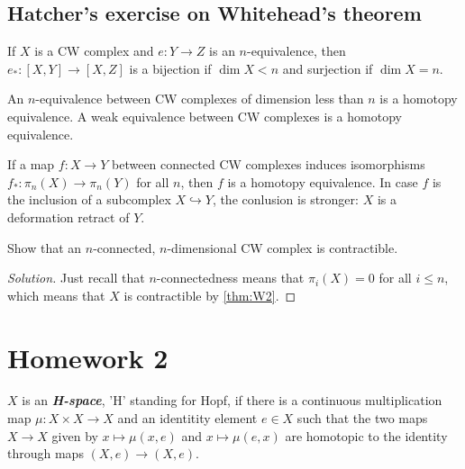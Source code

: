 \documentclass{article}
\numberwithin{equation}{section}
\begin{document}
\subsection{Hatcher's exercise on Whitehead's theorem}
\begin{thm}
	If $X$ is a CW complex and $e:Y\to Z$ is an $n$-equivalence, then $e_*:[X,Y]\to[X,Z]$ is a bijection if $\dim X<n$ and surjection if $\dim X=n$.
\end{thm}
\begin{thm}\label{thm:W2}
	An $n$-equivalence between CW complexes of dimension less than $n$ is a homotopy equivalence. A weak equivalence between CW complexes is a homotopy equivalence.
\end{thm}
\begin{thm}
	If a map $f:X\to Y$ between connected CW complexes induces isomorphisms $f_*:\pi_n(X)\to\pi_n(Y)$ for all $n$, then $f$ is a homotopy equivalence. In case $f$ is the inclusion of a subcomplex $X\hookrightarrow Y$, the conlusion is stronger: $X$ is a deformation retract of $Y$.
\end{thm}
\begin{exercise}[Hatcher 4.1.12]
	Show that an $n$-connected, $n$-dimensional CW complex is contractible.
\end{exercise}
\begin{proof}[Solution]
	Just recall that $n$-connectedness means that $\pi_i(X)=0$ for all $i\leq n$, which means that $X$ is contractible by \cref{thm:W2}.
\end{proof}

\section{Homework 2}
\begin{defn}
	$X$  is an \textit{\textbf{H-space}}, 'H' standing for Hopf, if there is a continuous multiplication map $\mu:X\times X\to X$ and an identitity element $e\in X$  such that the two maps $X\to X$ given by $x\mapsto\mu(x,e)$ and $x\mapsto\mu(e,x)$ are homotopic to the identity through maps $(X,e)\to(X,e)$. 
\end{defn}
\end{document}
